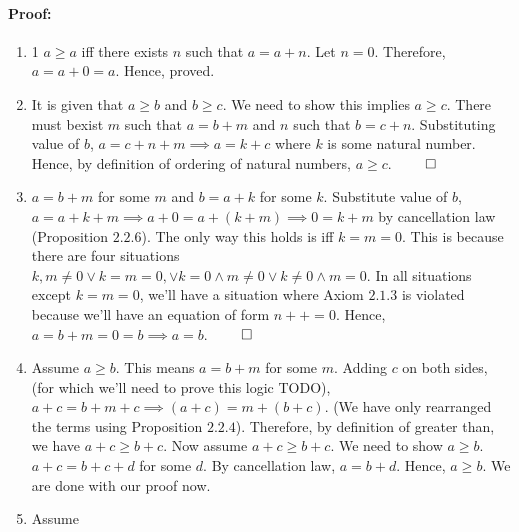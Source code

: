 \documentclass{report}
\begin{document}
\paragraph{Proof: }
\begin{enumerate}
	\item 1
		$a \ge a$ iff there exists  $n$ such that $a = a + n$. Let $n=0$. Therefore, $a= a + 0 = a$. Hence, proved.
	\item
		It is given that  $a \ge b$ and $b \ge c$. We need to show this implies $a \ge c$. There must bexist $m$ such that  $a = b + m$ and  $n$ such that $b = c + n$. Substituting value of $b$, $a = c + n + m \implies a = k + c$ where  $k$ is some natural number. Hence, by definition of ordering of natural numbers, $a \ge c$.  $\qed$   
	\item
		 $a = b + m$ for some  $m$ and $b = a + k$ for some $k$. Substitute value of $b$, $a = a + k + m \implies a + 0 = a + (k+m) \implies 0 = k +m $ by cancellation law (Proposition $2.2.6$). The only way this holds is iff $k = m = 0$.
	This is because there are four situations $k,m \ne 0 \lor k=m=0, \lor k = 0 \land m \ne 0 \lor k \ne 0 \land m=0$. In all situations except $k=m=0$, we'll have a situation where  Axiom  $2.1.3$ is violated because we'll have an equation of form  $n++=0$. Hence, $a = b + m = 0 = b \implies a = b$. $\qed$ 
\item 
	Assume $a \ge b$. This means $a = b + m$ for some $m$. Adding $c$ on both sides,   (for which we'll need to prove this logic TODO), $a + c = b + m + c \implies \left( a +c \right) = m + (b+c)$. (We have only rearranged the terms using Proposition $2.2.4$). Therefore, by definition of greater than, we have  $a + c \ge b+c$.
	Now assume  $a +c \ge b + c $. We need to show  $a \ge b$.  $a +c= b +c + d$ for some  $d$. 
By cancellation law, $a = b + d$. Hence, $a \ge b$.  We are done with our proof now.

\item 
Assume 
\end{enumerate}
\end{document}
